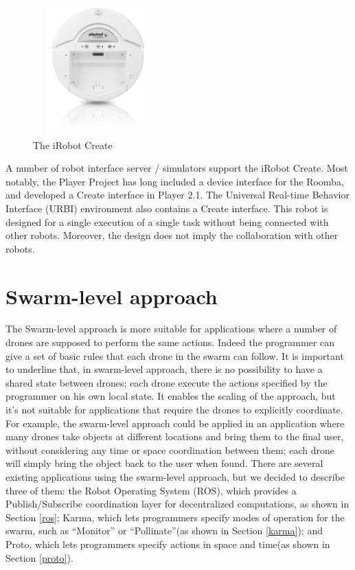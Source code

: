 \begin{figure}[H]
  \centering
  \includegraphics[width=5cm,height=5cm]{pictures/Irobot.png}
  \caption{The iRobot Create}
  \label{fig:irobot}
\end{figure}

A number of robot interface server / simulators support the iRobot Create. Most notably, the Player Project has long included a device interface for the Roomba, and developed a Create interface in Player 2.1. The Universal Real-time Behavior Interface (URBI) environment also contains a Create interface.
This robot is designed for a single execution of a single task without being connected with other robots. Moreover, the design does not imply the collaboration with other robots.
\\

\section{Swarm-level approach}\label{swarmLevel}

The Swarm-level approach\cite{swarm} is more suitable for applications where a number of drones are supposed to perform the same actions. Indeed the programmer can give a set of basic rules that each drone in the swarm can follow.
It is important to underline that, in swarm-level approach, there is no possibility to have a shared state between drones; each drone execute the actions specified by the programmer on his own local state.
It enables the scaling of the approach, but it's not suitable for applications that require the drones to explicitly coordinate.
For example, the swarm-level approach could be applied in an application where many drones take objects at different locations and bring them to the final user, without considering any time or space coordination between them; each drone will simply bring the object back to the user when found.  
There are several existing applications using the swarm-level approach, but we decided to describe three of them:
the Robot Operating System (ROS)\cite{ros}, which provides a Publish/Subscribe coordination layer for decentralized computations, as shown in Section \ref{ros}; Karma\cite{karma}, which lets programmers specify modes of operation for the swarm, such as “Monitor” or “Pollinate”(as shown in Section \ref{karma}); and Proto\cite{proto}, which lets programmers specify actions in space and time(as shown in Section \ref{proto}). 

